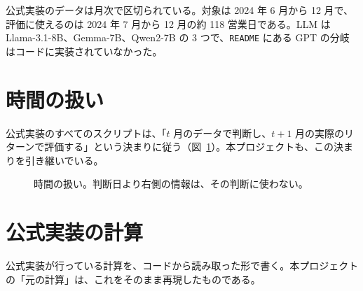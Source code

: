 \documentclass[xelatex,ja=standard,jafont=hiragino-pron,a4paper,10pt]{bxjsreport}
\newcommand{\code}[1]{\texttt{#1}}
\newcommand{\figref}[1]{図~\ref{#1}}
\begin{document}
公式実装のデータは月次で区切られている。対象は 2024 年 6 月から 12 月で、評価に使えるのは 2024 年 7 月から 12 月の約 118 営業日である。LLM は Llama-3.1-8B、Gemma-7B、Qwen2-7B の 3 つで、\code{README} にある GPT の分岐はコードに実装されていなかった。

\section{時間の扱い}

公式実装のすべてのスクリプトは、「$t$ 月のデータで判断し、$t+1$ 月の実際のリターンで評価する」という決まりに従う（\figref{fig:timeline}）。本プロジェクトも、この決まりを引き継いでいる。

\begin{figure}[htbp]
\centering
{}
\caption{時間の扱い。判断日より右側の情報は、その判断に使わない。}
\label{fig:timeline}
\end{figure}

\section{公式実装の計算}\label{sec:original-calc}

公式実装が行っている計算を、コードから読み取った形で書く。本プロジェクトの「元の計算」は、これをそのまま再現したものである。
\end{document}
